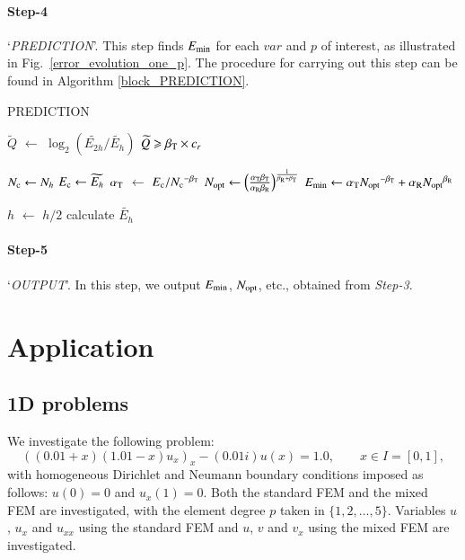 \documentclass[review,3p]{elsarticle}
\begin{document}
\paragraph{Step-4} `\textit{PREDICTION}'. This step finds $E_{\rm min}$ for each $var$ and $p$ of interest, as illustrated in Fig.~\ref{error_evolution_one_p}.
The procedure for carrying out this step can be found in Algorithm \ref{block_PREDICTION}.

\vspace{0.2cm}
\begin{algorithm}[H]
\caption{PREDICTION}			%
\label{block_PREDICTION}
    {
        $\widetilde{Q}$ $\gets$ $\log _2 \left( {\widetilde {E_{2h}}}/{\widetilde {E_{h}}} \right)$\;
        \eIf
        {
            $\widetilde{Q} \geqslant \beta_{\rm T} \times c_r$
        }
        {
            $N_{\rm c} \gets N_h$\;
            $E_{\rm c} \gets \widetilde {E_{h}}$\;
            $\alpha_{\rm T}$ $\gets$ ${E_{\rm c}}/{N_{\rm c}}^{- \beta_{\rm T}}$\;
            $N_{\rm opt} \gets \left( \frac{\alpha_{\rm T} \beta_{\rm T}}{\alpha _{\rm R} \beta_{\rm R}} \right)^{\frac{1}{\beta_{\rm R} + \beta_{\rm T}}}$\;
            $E_{\rm min} \gets \alpha_{\rm T} {N_{\rm opt}}^{- {\beta _{\rm T}}} + \alpha_{\rm R} {N_{\rm opt}}^{{\beta _{\rm R}}}$\;

        }
        {
            $h$ $\gets$ $h/2$\;
            calculate $\widetilde {E_{h}}$\;
        }
	}    
\end{algorithm}

\paragraph{Step-5} `\textit{OUTPUT}'. In this step, we output $E_{\rm min}$, $N_{\rm opt}$, etc., obtained from \textit{Step-3}.


\section{Application}					\label{section_validation}

\subsection{1D problems}
We investigate the following problem:
\begin{equation}
  \left((0.01+x)(1.01-x) u_x \right)_x -(0.01i) u(x) = 1.0,\qquad x \in I = [0,1],	\label{1D_Helmholtz_equation_application}
\end{equation}
with homogeneous Dirichlet and Neumann boundary conditions imposed as follows: $u(0)=0$ and $u_x(1)=0$.
Both the standard FEM and the mixed FEM are investigated, with the element degree $p$ taken in $\{1, 2, \ldots, 5\}$. Variables $u$, $u_x$ and $u_{xx}$ using the standard FEM and $u$, $v$ and $v_x$ using the mixed FEM are investigated.
\end{document}

